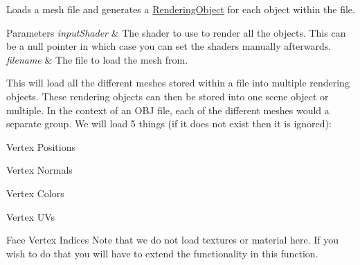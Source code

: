 Loads a mesh file and generates a \hyperlink{class_rendering_object}{Rendering\+Object} for each object within the file. 


\begin{DoxyParams}{Parameters}
{\em input\+Shader} & The shader to use to render all the objects. This can be a null pointer in which case you can set the shaders manually afterwards. \\
\hline
{\em filename} & The file to load the mesh from.\\
\hline
\end{DoxyParams}
This will load all the different meshes stored within a file into multiple rendering objects. These rendering objects can then be stored into one scene object or multiple. In the context of an O\+BJ file, each of the different meshes would a separate group. We will load 5 things (if it does not exist then it is ignored)\+:
\begin{DoxyItemize}
\item Vertex Positions
\item Vertex Normals
\item Vertex Colors
\item Vertex U\+Vs
\item Face Vertex Indices Note that we do not load textures or material here. If you wish to do that you will have to extend the functionality in this function. 
\end{DoxyItemize}